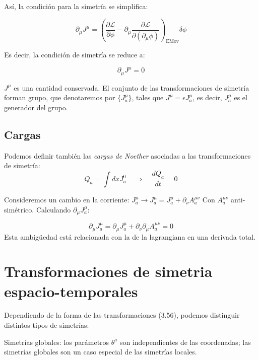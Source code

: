 Así, la condición para la simetría se simplifica:

$$
\partial_\mu J^\mu = \left( \frac{\partial \mathcal{L}}{\partial \phi} - \partial_\mu \frac{\partial \mathcal{L}}{\partial (\partial_\mu \phi)} \right)_{\text{EMov}} \delta \phi
$$

Es decir, la condición de simetría se reduce a:

$$
\partial_\mu J^\mu = 0
$$

$ J^\mu $ es una cantidad conservada. El conjunto de las transformaciones de simetría forman grupo, que denotaremos por $\{J^\mu_a\}$, tales que $J^\mu=\epsilon J^\mu_a$, es decir,  $J^\mu_a$ es el generador del grupo.



\subsection{Cargas}
Podemos definir también las \textit{cargas de Noether} asociadas a las transformaciones de simetría:
$$
Q_a = \int dx J^0_a \quad \Rightarrow \quad \frac{dQ_a}{dt} = 0
$$

Consideremos un cambio en la corriente: $ J^\mu_a \rightarrow J^\mu_a = J^\mu_a + \partial_\nu A^{\mu \nu}_a $ Con $ A^{\mu \nu}_a $ anti-simétrico. Calculando $ \partial_\mu J^\mu_a $:

$$
\partial_\mu J^\mu_a = \partial_\mu J^\mu_a + \partial_\nu \partial_\mu A^{\mu \nu}_a = 0
$$
Esta ambigüedad está relacionada con la de la lagrangiana en una derivada total.
\section{Transformaciones de simetria espacio-temporales}
Dependiendo de la forma de las transformaciones (3.56), podemos distinguir distintos tipos de simetrías:

Simetrías globales: los parámetros $\theta^{a}$ son independientes de las coordenadas; las simetrías globales son un caso especial de las simetrías locales.

